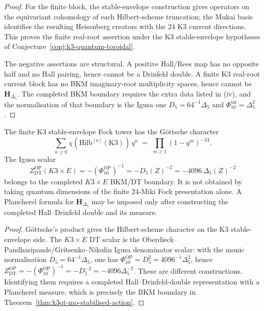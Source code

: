 \begin{proof}
For the finite block, the stable-envelope construction gives
operators on the equivariant cohomology of each Hilbert-scheme
truncation; the Mukai basis identifies the resulting Heisenberg
creators with the $24$ K3 current directions. This proves the
finite real-root assertion under the K3 stable-envelope hypotheses of
Conjecture~\ref{conj:k3-quantum-toroidal}.

The negative assertions are structural. A positive Hall/Rees map has no
opposite half and no Hall pairing, hence cannot be a Drinfeld double.
A finite K3 real-root current block has no BKM imaginary-root
multiplicity spaces, hence cannot be $\mathbf H_{\Delta_5}$. The
completed BKM boundary requires the extra data listed in (iv), and the
normalisation of that boundary is the Igusa one
$D_5=64^{-1}\Delta_5$ and
$\Phi_{10}^{\mathrm{un}}=\Delta_5^2$.
\end{proof}

\begin{corollary}
\label{cor:k3qt-plancherel-qu-dim}
The finite K3 stable-envelope Fock tower has the G\"ottsche character
\[
 \sum_{n\geq0}\chi(\mathrm{Hilb}^{[n]}(\mathrm K3))\,q^n
 \;=\;
 \prod_{m\geq1}(1-q^m)^{-24}.
\]
The Igusa scalar
\[
 Z^{\mathrm{OP}}_{\mathrm{DT}}(K3\times E)
 = -(\Phi_{10}^{\mathrm{OP}})^{-1}
 = -D_5(Z)^{-2}
 = -4096\,\Delta_5(Z)^{-2}
\]
belongs to the completed $K3\times E$ BKM/DT boundary. It is not
obtained by taking quantum dimensions of the finite $24$-Miki Fock
presentation alone. A Plancherel formula for
$\mathbf H_{\Delta_5}$ may be imposed only after constructing the
completed Hall--Drinfeld double and its measure.
\end{corollary}

\begin{proof}
G\"ottsche's product gives the Hilbert-scheme character on the K3
stable-envelope side. The $K3\times E$ DT scalar is the
Oberdieck--Pandharipande/Gritsenko--Nikulin Igusa denominator scalar:
with the monic normalisation $D_5=64^{-1}\Delta_5$, one has
$\Phi_{10}^{\mathrm{OP}}=D_5^2=4096^{-1}\Delta_5^2$, hence
$Z_{\mathrm{DT}}^{\mathrm{OP}}=-(\Phi_{10}^{\mathrm{OP}})^{-1}
=-D_5^{-2}=-4096\Delta_5^{-2}$. These are different constructions.
Identifying them requires a completed
Hall--Drinfeld-double representation with a Plancherel measure, which
is precisely the BKM boundary in
Theorem~\ref{thm:k3qt-mo-stabilised-action}.
\end{proof}

